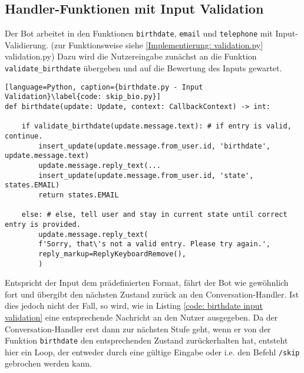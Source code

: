         \subsection{Handler-Funktionen mit Input Validation} \label{Implementierung: birthdate.py}
            Der Bot arbeitet in den Funktionen \verb|birthdate|, \verb|email| und \verb|telephone| mit Input-Validierung. (zur Funktionsweise siehe \ref{Implementierung: validation.py} validation.py) Dazu wird die Nutzereingabe zunächst an die Funktion \verb|validate_birthdate| übergeben und auf die Bewertung des Inputs gewartet. 
            \begin{lstlisting}[language=Python, caption={birthdate.py - Input Validation}\label{code: skip_bio.py}]
def birthdate(update: Update, context: CallbackContext) -> int:

    if validate_birthdate(update.message.text): # if entry is valid, continue.
        insert_update(update.message.from_user.id, 'birthdate', update.message.text)
        update.message.reply_text(...
        insert_update(update.message.from_user.id, 'state', states.EMAIL)
        return states.EMAIL

    else: # else, tell user and stay in current state until correct entry is provided.
        update.message.reply_text(
        f'Sorry, that\'s not a valid entry. Please try again.',
        reply_markup=ReplyKeyboardRemove(),
        )
            \end{lstlisting}
                
            Entspricht der Input dem prädefinierten Format, fährt der Bot wie gewöhnlich fort und übergibt den nächsten Zustand zurück an den Conversation-Handler. Ist dies jedoch nicht der Fall, so wird, wie in Listing \ref*{code: birthdate input validation} eine entsprechende Nachricht an den Nutzer ausgegeben. Da der Conversation-Handler erst dann zur nächsten Stufe geht, wenn er von der Funktion \verb|birthdate| den entsprechenden Zustand zurückerhalten hat, entsteht hier ein Loop, der entweder durch eine gültige Eingabe oder i.e. den Befehl \verb|/skip| gebrochen werden kann.
        
            


